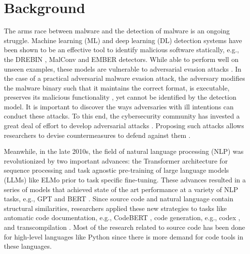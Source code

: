 \documentclass[conference]{IEEEtran}
\begin{document}
\IEEEpeerreviewmaketitle


\section{Background}
\label{sec:Background}

The arms race between malware and the detection of malware is an ongoing struggle. Machine learning (ML) and deep learning (DL) detection systems have been shown to be an effective tool to identify malicious software statically, e.g., the DREBIN \cite{arp2014drebin}, MalConv \cite{raff2018malware} and EMBER \cite{anderson2018ember} detectors. While able to perform well on unseen examples, these models are vulnerable to adversarial evasion attacks \cite{szegedy2013intriguing}. In the case of a practical adversarial malware evasion attack, the adversary modifies the malware binary such that it maintains the correct format, is executable, preserves its malicious functionality \cite{ling2021adversarial}, yet cannot be identified by the detection model. It is important to discover the ways adversaries with ill intentions can conduct these attacks. To this end, the cybersecurity community has invested a great deal of effort to develop adversarial attacks \cite{maiorca2019towards, park2020survey, li2021arms, ling2021adversarial}. Proposing such attacks allows researchers to devise countermeasures to defend against them \cite{li2021framework}.

Meanwhile, in the late 2010s, the field of natural language processing (NLP) was revolutionized by two important advances: the Transformer architecture for sequence processing \cite{vaswani2017attention} and task agnostic pre-training of large language models (LLMs) like ELMo \cite{peters2018deep} prior to task specific fine-tuning. These advances resulted in a series of models that achieved state of the art performance at a variety of NLP tasks, e.g., GPT \cite{radford2018improving} and BERT \cite{devlin2018bert}. Since source code and natural language contain structural similarities, researchers applied these new strategies to tasks like automatic code documentation, e.g., CodeBERT \cite{feng2020codebert}, code generation, e.g., codex \cite{chen2021evaluating}, and transcompilation \cite{roziere2020unsupervised}. Most of the research related to source code has been done for high-level languages like Python since there is more demand for code tools in these languages. 
\end{document}
